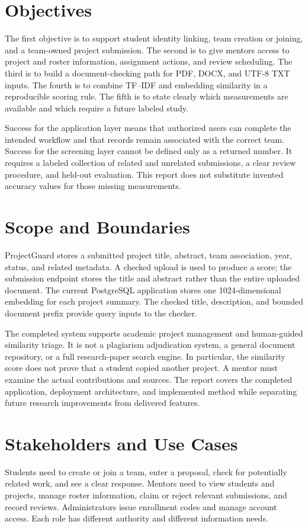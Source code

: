\documentclass[12pt,a4paper]{report}
\begin{document}
\section{Objectives}
The first objective is to support student identity linking, team creation or joining, and a team-owned project submission. The second is to give mentors access to project and roster information, assignment actions, and review scheduling. The third is to build a document-checking path for PDF, DOCX, and UTF-8 TXT inputs. The fourth is to combine TF--IDF and embedding similarity in a reproducible scoring rule. The fifth is to state clearly which measurements are available and which require a future labeled study.

Success for the application layer means that authorized users can complete the intended workflow and that records remain associated with the correct team. Success for the screening layer cannot be defined only as a returned number. It requires a labeled collection of related and unrelated submissions, a clear review procedure, and held-out evaluation. This report does not substitute invented accuracy values for those missing measurements.

\section{Scope and Boundaries}
ProjectGuard stores a submitted project title, abstract, team association, year, status, and related metadata. A checked upload is used to produce a score; the submission endpoint stores the title and abstract rather than the entire uploaded document. The current PostgreSQL application stores one 1024-dimensional embedding for each project summary. The checked title, description, and bounded document prefix provide query inputs to the checker.

The completed system supports academic project management and human-guided similarity triage. It is not a plagiarism adjudication system, a general document repository, or a full research-paper search engine. In particular, the similarity score does not prove that a student copied another project. A mentor must examine the actual contributions and sources. The report covers the completed application, deployment architecture, and implemented method while separating future research improvements from delivered features.


\section{Stakeholders and Use Cases}
Students need to create or join a team, enter a proposal, check for potentially related work, and see a clear response. Mentors need to view students and projects, manage roster information, claim or reject relevant submissions, and record reviews. Administrators issue enrollment codes and manage account access. Each role has different authority and different information needs.
\end{document}
